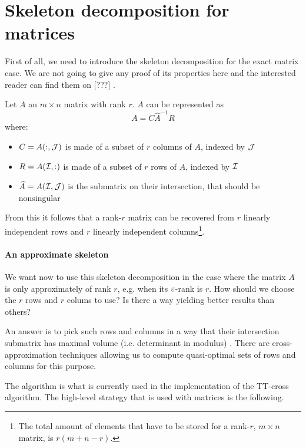 \section{Skeleton decomposition for matrices}
First of all, we need to introduce the skeleton decomposition for the exact matrix case. We are not going to give any proof of its properties here and the interested reader can find them on [???] .

\begin{Teo}
  Let $A$ an $m \times n$ matrix with rank $r$. $A$ can be represented as
  \begin{equation} \label{def:skeleton}
    A = C \hat{A}^{-1} R
  \end{equation}
  where:
  \begin{itemize}
  \item $C = A(:,\mathcal{J})$ is made of a subset of $r$ columns of $A$, indexed by $\mathcal{J}$
  \item $R = A(\mathcal{I},:)$ is made of a subset of $r$ rows of $A$, indexed by $\mathcal{I}$
  \item $\widehat{A} = A(\mathcal{I},\mathcal{J})$ is the submatrix on their intersection, that should be nonsingular
  \end{itemize}
\end{Teo}

From this it follows that a rank-$r$ matrix can be recovered from $r$ linearly independent rows and $r$ linearly independent columns\footnote{The total amount of elements that have to be stored for a rank-$r$, $m \times n$ matrix, is $r(m+n-r)$.}.

\paragraph{An approximate skeleton}
We want now to use this skeleton decomposition in the case where the matrix $A$ is only approximately of rank $r$, e.g. when its $\varepsilon$-rank is $r$.
How should we choose the $r$ rows and $r$ colums to use? Is there a way yielding better results than others?

An answer is to pick such rows and columns in a way that their intersection submatrix has maximal volume (i.e. determinant in modulus) . There are cross-approximation techniques allowing us to compute quasi-optimal sets of rows and columns for this purpose.

The  algorithm is what is currently used in the implementation of the TT-cross algorithm.
The high-level strategy that is used with matrices is the following.

